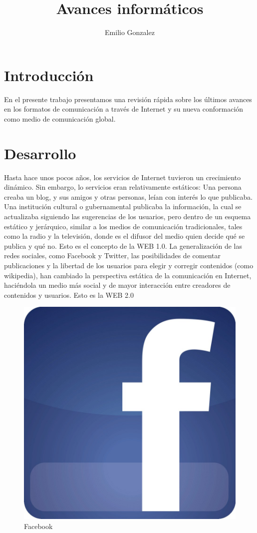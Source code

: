 \documentclass[a4paper,11pt]{article}
\title{Avances informáticos}
\author{Emilio Gonzalez}
\begin{document}
\maketitle



\section{Introducción}

En el presente trabajo presentamos una revisión rápida sobre los últimos avances  en los formatos de comunicación a través de Internet y su nueva conformación como medio de comunicación global.


\section{Desarrollo}

Hasta hace unos pocos años, los servicios de Internet tuvieron un crecimiento dinámico. Sin embargo, lo servicios eran relativamente estáticos: Una persona creaba un blog, y sus amigos y otras personas, leían con interés lo que publicaba. Una institución cultural o gubernamental publicaba la información, la cual se actualizaba siguiendo las sugerencias de los usuarios, pero dentro de un esquema estático y jerárquico, similar a los medios de comunicación tradicionales, tales como la radio y la televisión, donde es el difusor del medio quien decide qué se publica y qué no. Esto es el concepto de la WEB 1.0. La generalización de las redes sociales, como Facebook y Twitter, las posibilidades de comentar publicaciones y la libertad de los usuarios para elegir y corregir contenidos (como wikipedia), han cambiado la perspectiva estática de la comunicación en Internet, haciéndola un medio más social y de mayor interacción entre creadores de contenidos y usuarios. Esto es la WEB 2.0


\begin{figure}[h]
\begin{center} 
\bigskip
\includegraphics[trim=15 30 30 0,clip,height=0.3\textwidth]{facebook.jpg} \hspace{5mm}

\end{center}
\vspace{-5mm}
\caption{Facebook}
\end{figure}
\end{document}
